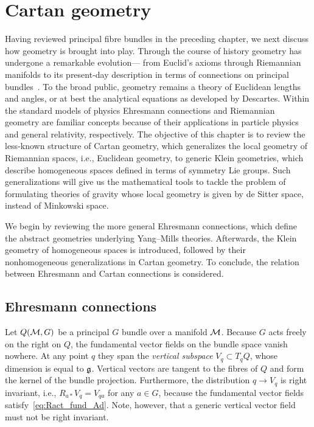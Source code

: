 \documentclass[
final,
11pt,
a4paper,
DIV=11,
headinclude=true,
footinclude=false,
bibliography=totoc,
twoside=true,  %
BCOR=5mm
]{scrbook}
\begin{document}
\chapter{Cartan geometry}
\label{ch:Cartan_geo}

Having reviewed principal fibre bundles in the preceding chapter, 
we next discuss how geometry is brought into play. Through the 
course of history geometry has undergone a remarkable 
evolution--- from Euclid's axioms through Riemannian manifolds to 
its present-day description in terms of connections on principal 
bundles~\cite{Chern:1990wg}. To the broad public, geometry 
remains a theory of Euclidean lengths and angles, or at best the 
analytical equations as developed by Descartes. Within the 
standard models of physics Ehresmann connections and Riemannian 
geometry are familiar concepts because of their applications in 
particle physics and general relativity, respectively. The 
objective of this chapter is to review the less-known structure 
of Cartan geometry, which generalizes the local geometry of 
Riemannian spaces, i.e., Euclidean geometry, to generic Klein 
geometries, which describe homogeneous spaces defined in terms of 
symmetry Lie groups. Such generalizations will give us the 
mathematical tools to tackle the problem of formulating theories 
of gravity whose local geometry is given by de Sitter space, 
instead of Minkowski space.

We begin by reviewing the more general Ehresmann connections, 
which define the abstract geometries underlying Yang--Mills 
theories.  Afterwards, the Klein geometry of homogeneous spaces 
is introduced, followed by their nonhomogeneous generalizations 
in Cartan geometry. To conclude, the relation between Ehresmann 
and Cartan connections is considered.

\section{Ehresmann connections}
\label{sec:Ehresmann_conn}

Let $Q(\mathcal{M},G)$ be a principal $G$ bundle over a manifold 
$\mathcal{M}$. Because $G$ acts freely on the right on $Q$, the 
fundamental vector fields on the bundle space vanish nowhere. At 
any point $q$ they span the \emph{vertical subspace} $V_q \subset 
T_q Q$, whose dimension is equal to $\mathfrak{g}$. Vertical vectors 
are tangent to the fibres of $Q$ and form the kernel of the 
bundle projection. Furthermore, the distribution $q \to V_q$ is 
right invariant, i.e., $R_{a*}V_q = V_{qa}$ for any $a \in G$, 
because the fundamental vector fields 
satisfy~\eqref{eq:Ract_fund_Ad}. Note, however, that a generic 
vertical vector field must not be right invariant. 
\end{document}

